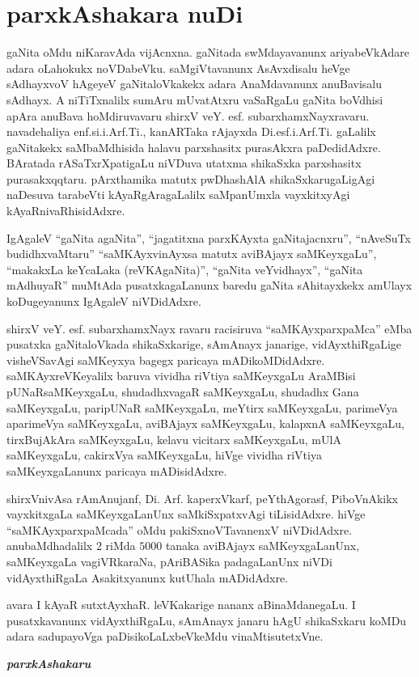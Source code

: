 \chapter*{parxkAshakara nuDi}
\vskip -10pt

gaNita oMdu niKaravAda vijAcnxna. gaNitada swMdayavanunx ariyabeVkAdare adara oLahokukx noVDabeVku. saMgiVtavanunx AsAvxdisalu heVge sAdhayxvoV hAgeyeV gaNitaloVkakekx adara AnaMdavanunx anuBavisalu sAdhayx. A niTiTxnalilx sumAru mUvatAtxru vaSaRgaLu gaNita boVdhisi apAra anuBava hoMdiruvavaru shirxV veY. esf. subarxhamxNayxravaru. navadehaliya enf.si.i.Arf.Ti., kanARTaka rAjayxda Di.esf.i.Arf.Ti. gaLalilx gaNitakekx saMbaMdhisida halavu parxshasitx purasAkxra paDedidAdxre. BAratada rASaTxrXpatigaLu niVDuva utatxma shikaSxka parxshasitx purasakxqqtaru. pArxthamika matutx pwDhashAlA shikaSxkarugaLigAgi naDesuva tarabeVti kAyaRgAragaLalilx saMpanUmxla vayxkitxyAgi kAyaRnivaRhisidAdxre.

IgAgaleV ``gaNita agaNita'', ``jagatitxna parxKAyxta gaNitajacnxru'', ``nAveSuTx budidhxvaMtaru'' ``saMKAyxvinAyxsa matutx aviBAjayx saMKeyxgaLu'', ``makakxLa keYcaLaka (reVKAgaNita)'', ``gaNita veYvidhayx'', ``gaNita mAdhuyaR'' muMtAda pusatxkagaLanunx baredu gaNita sAhitayxkekx amUlayx koDugeyanunx IgAgaleV niVDidAdxre.

shirxV veY. esf. subarxhamxNayx ravaru racisiruva ``saMKAyxparxpaMca'' eMba pusatxka gaNitaloVkada shikaSxkarige, sAmAnayx janarige, vidAyxthiRgaLige visheVSavAgi saMKeyxya bagegx paricaya mADikoMDidAdxre. saMKAyxreVKeyalilx baruva vividha riVtiya saMKeyxgaLu AraMBisi pUNaRsaMKeyxgaLu, shudadhxvagaR saMKeyxgaLu, shudadhx Gana saMKeyxgaLu, paripUNaR saMKeyxgaLu, meYtirx saMKeyxgaLu, parimeVya aparimeVya saMKeyxgaLu, aviBAjayx saMKeyxgaLu, kalapxnA saMKeyxgaLu, tirxBujAkAra saMKeyxgaLu, kelavu vicitarx saMKeyxgaLu, mUlA saMKeyxgaLu, cakirxVya saMKeyxgaLu, hiVge vividha riVtiya saMKeyxgaLanunx paricaya mADisidAdxre.

shirxVnivAsa rAmAnujanf, Di. Arf. kaperxVkarf, peYthAgorasf, PiboVnAkikx vayxkitxgaLa saMKeyxgaLanUnx saMkiSxpatxvAgi tiLisidAdxre. hiVge ``saMKAyxparxpaMcada'' oMdu pakiSxnoVTavanenxV niVDidAdxre. anubaMdhadalilx $2$ riMda $5000$ tanaka aviBAjayx saMKeyxgaLanUnx, saMKeyxgaLa vagiVRkaraNa, pAriBASika padagaLanUnx niVDi vidAyxthiRgaLa Asakitxyanunx kutUhala mADidAdxre.

avara I kAyaR sutxtAyxhaR. leVKakarige nananx aBinaMdanegaLu. I pusatxkavanunx vidAyxthiRgaLu, sAmAnayx janaru hAgU shikaSxkaru koMDu adara sadupayoVga paDisikoLaLxbeVkeMdu vinaMtisutetxVne.

\bigskip
\medskip

\hfill {\bf\slshape parxkAshakaru}


